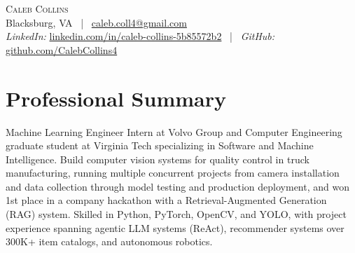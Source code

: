 \documentclass[letterpaper,10pt]{article}
\begin{document}
\begin{center}
    {\LARGE \scshape Caleb Collins} \\ \vspace{2pt}
    \small Blacksburg, VA ~|~
    \href{mailto:caleb.coll4@gmail.com}{caleb.coll4@gmail.com} \\
    \small \textit{LinkedIn:} \href{https://www.linkedin.com/in/caleb-collins-5b85572b2}{linkedin.com/in/caleb-collins-5b85572b2} ~|~ \textit{GitHub:} \href{https://github.com/CalebCollins4}{github.com/CalebCollins4}
\end{center}

\section{Professional Summary}
\small Machine Learning Engineer Intern at Volvo Group and Computer Engineering graduate student at Virginia Tech specializing in Software and Machine Intelligence. Build computer vision systems for quality control in truck manufacturing, running multiple concurrent projects from camera installation and data collection through model testing and production deployment, and won 1st place in a company hackathon with a Retrieval-Augmented Generation (RAG) system. Skilled in Python, PyTorch, OpenCV, and YOLO, with project experience spanning agentic LLM systems (ReAct), recommender systems over 300K+ item catalogs, and autonomous robotics.

\end{document}
